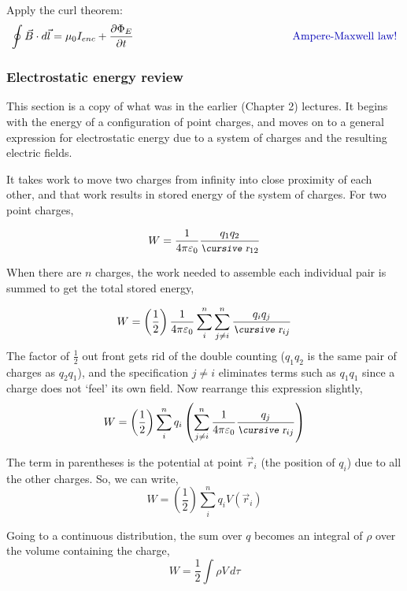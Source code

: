 \documentclass[12pt]{article}
\begin{document}
\begin{flushleft}
Apply the curl theorem:
  \begin{equation*}
\oint \vec{B} \cdot d\vec{l}  = \mu_{0}I_{enc} +\frac{\partial \Phi_{E} }{\partial t} \hspace{2.in} \mbox{\color{myblue} Ampere-Maxwell law!}
\end{equation*}

\subsubsection*{\color{myblue} \bf Electrostatic energy review}

This section is a copy of what was in the earlier (Chapter 2) lectures.  It begins with the energy of a configuration of point charges, and moves on to a general expression for electrostatic energy due to a system of charges and the resulting electric fields.

It takes work to move two charges from infinity into close proximity of each other, and that work results in stored energy of the system of charges.  For two point charges,

 \[
 W = \frac{1}{4\pi \varepsilon_{0}} \frac{q_{1}q_{2}}{\text{\small\slshape\cursive r}_{12}}
 \] 

When there are $n$ charges, the work needed to assemble each individual pair is summed to get the total stored energy,

 \[
 W = \left( \frac{1}{2} \right) \frac{1}{4\pi \varepsilon_{0}} \sum_{i}^{n} \sum_{j\ne i}^{n} \frac{q_{i}q_{j}}{\text{\small\slshape\cursive r}_{ij}}
 \] 
The factor of $\frac{1}{2}$ out front gets rid of the double counting ($q_{1}q_{2}$ is the same pair of charges as $q_{2}q_{1}$), and the specification $j \ne i$ eliminates terms such as $q_{1}q_{1}$ since a charge does not `feel' its own field.  Now rearrange this expression slightly,
\[
 W = \left( \frac{1}{2} \right)  \sum_{i}^{n} q_{i} \left( \sum_{j\ne i}^{n} \frac{1}{4\pi \varepsilon_{0}} \frac{q_{j}}{\text{\small\slshape\cursive r}_{ij}} \right)
 \] 

The term in parentheses is the potential at point $\vec{r}_{i}$ (the position of $q_{i}$) due to all the other charges.  So, we can write,
\[
 W = \left( \frac{1}{2} \right)  \sum_{i}^{n} q_{i} V(\vec{r}_{i})
 \] 

Going to a continuous distribution, the sum over $q$ becomes an integral of $\rho$ over the volume containing the charge,
\begin{equation}
 W = \frac{1}{2}   \int \rho V \, d\tau
 \label{eq:intpot}
 \end{equation} 


\end{flushleft}
\end{document}

